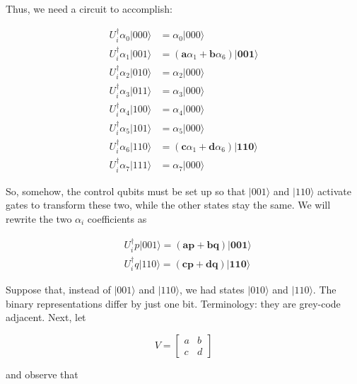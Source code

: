 \documentclass[main.tex]{subfiles}
\begin{document}
    Thus, we need a circuit to accomplish:
    
    $$
    \begin{aligned}
    U_{i}^{\dagger} \alpha_{0}|000\rangle &=\alpha_{0}|000\rangle \\
    U_{i}^{\dagger} \alpha_{1}|001\rangle &=\left(\mathbf{a} \alpha_{1}+\mathbf{b} \alpha_{6}\right)|\mathbf{0 0 1}\rangle \\
    U_{i}^{\dagger} \alpha_{2}|010\rangle &=\alpha_{2}|000\rangle \\
    U_{i}^{\dagger} \alpha_{3}|011\rangle &=\alpha_{3}|000\rangle \\
    U_{i}^{\dagger} \alpha_{4}|100\rangle &=\alpha_{4}|000\rangle \\
    U_{i}^{\dagger} \alpha_{5}|101\rangle &=\alpha_{5}|000\rangle \\
    U_{i}^{\dagger} \alpha_{6}|110\rangle &=\left(\mathbf{c} \alpha_{1}+\mathbf{d} \alpha_{6}\right)|\mathbf{1 1 0}\rangle \\
    U_{i}^{\dagger} \alpha_{7}|111\rangle &=\alpha_{7}|000\rangle
    \end{aligned}
    $$
    
    So, somehow, the control qubits must be set up so that $|001\rangle$ and $|110\rangle$ activate gates to transform these two, while the other states stay the same. We will rewrite the two $\alpha_{i}$ coefficients as
    
    $$
    \begin{aligned}
    &U_{i}^{\dagger} p|001\rangle=(\mathbf{a p}+\mathbf{b q})|\mathbf{0 0 1}\rangle \\
    &U_{i}^{\dagger} q|110\rangle=(\mathbf{c p}+\mathbf{d q})|\mathbf{1 1 0}\rangle
    \end{aligned}
    $$
    
    Suppose that, instead of $|001\rangle$ and $|110\rangle$, we had states $|010\rangle$ and $|110\rangle$. The binary representations differ by just one bit. Terminology: they are grey-code adjacent. Next, let
    
    $$
    V=\left[\begin{array}{ll}
    a & b \\
    c & d
    \end{array}\right]
    $$
    
    and observe that
    
\end{document}
